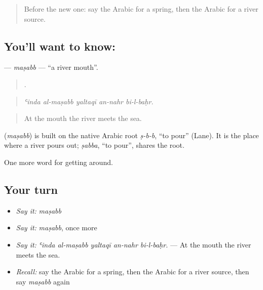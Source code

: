 \begin{quote}
Before the new one: say the Arabic for a spring, then the Arabic for a river source.
\end{quote}

\subsection*{You'll want to know: }
\textbf{} — \emph{maṣabb} — \textquotedblleft{}a river mouth\textquotedblright{}.

\begin{quote}
    .
\end{quote}

\begin{quote}
\emph{ʿinda al-maṣabb yaltaqī an-nahr bi-l-baḥr.}
\end{quote}

\begin{quote}
At the mouth the river meets the sea.
\end{quote}

\begin{cousinweb}
\textbf{} (\emph{maṣabb}) is built on the native Arabic root \emph{ṣ-b-b}, \textquotedblleft{}to pour\textquotedblright{} (Lane). It is the place where a river pours out; \emph{ṣabba}, \textquotedblleft{}to pour\textquotedblright{}, shares the root.
\end{cousinweb}

\begin{grammarlens}[title={What you've built}]
One more word for getting around.
\end{grammarlens}

\subsection*{Your turn}
\begin{itemize}
\raggedright
  \item \emph{Say it:} \emph{maṣabb}
  \item \emph{Say it:} \emph{maṣabb}, once more
  \item \emph{Say it:} \emph{ʿinda al-maṣabb yaltaqī an-nahr bi-l-baḥr.} — At the mouth the river meets the sea.
  \item \emph{Recall:} say the Arabic for a spring, then the Arabic for a river source, then say \emph{maṣabb} again
\end{itemize}

